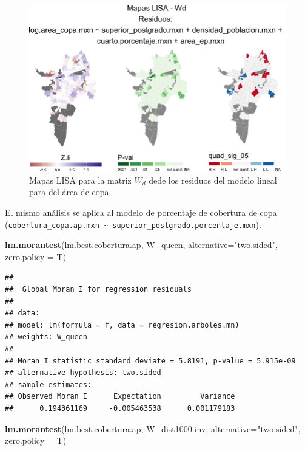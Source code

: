 \documentclass[12pt,]{book}
\newenvironment{Shaded}{\begin{snugshade}}{\end{snugshade}}
\newcommand{\KeywordTok}[1]{\textcolor[rgb]{0.13,0.29,0.53}{\textbf{#1}}}
\newcommand{\DataTypeTok}[1]{\textcolor[rgb]{0.13,0.29,0.53}{#1}}
\newcommand{\StringTok}[1]{\textcolor[rgb]{0.31,0.60,0.02}{#1}}
\newcommand{\NormalTok}[1]{#1}
\begin{document}
\begin{figure}
\includegraphics[width=1\linewidth]{tesis-unigis_files/figure-latex/mapas-lisa-rescopa-wd-1} \caption{Mapas LISA para la matriz $W_d$ dede los residuos del modelo lineal para del área de copa}\label{fig:mapas-lisa-rescopa-wd}
\end{figure}

El mismo análisis se aplica al modelo de porcentaje de cobertura de copa
(\texttt{cobertura\_copa.ap.mxn\ \textasciitilde{}\ superior\_postgrado.porcentaje.mxn}).

\begin{Shaded}
\begin{Highlighting}[]
\KeywordTok{lm.morantest}\NormalTok{(lm.best.cobertura.ap, }
\NormalTok{             W_queen, }\DataTypeTok{alternative=}\StringTok{"two.sided"}\NormalTok{,}
             \DataTypeTok{zero.policy =}\NormalTok{ T)}
\end{Highlighting}
\end{Shaded}

\begin{verbatim}
## 
##  Global Moran I for regression residuals
## 
## data:  
## model: lm(formula = f, data = regresion.arboles.mn)
## weights: W_queen
## 
## Moran I statistic standard deviate = 5.8191, p-value = 5.915e-09
## alternative hypothesis: two.sided
## sample estimates:
## Observed Moran I      Expectation         Variance 
##      0.194361169     -0.005463538      0.001179183
\end{verbatim}

\begin{Shaded}
\begin{Highlighting}[]
\KeywordTok{lm.morantest}\NormalTok{(lm.best.cobertura.ap, }
\NormalTok{             W_dist1000.inv, }
             \DataTypeTok{alternative=}\StringTok{"two.sided"}\NormalTok{,}
             \DataTypeTok{zero.policy =}\NormalTok{ T)}
\end{Highlighting}
\end{Shaded}
\end{document}
